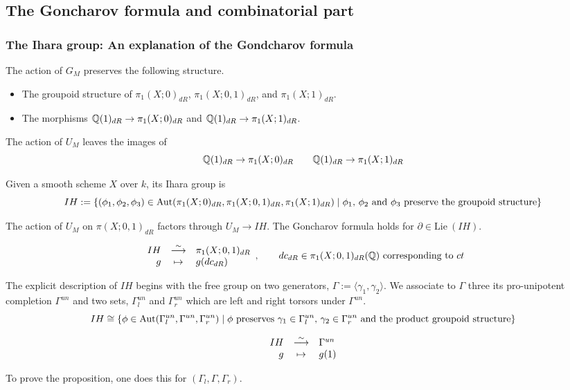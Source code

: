 \subsection{The Goncharov formula and combinatorial part}
\subsubsection{The Ihara group: An explanation of the Gondcharov formula}
\begin{rem}
The action of $G_M$ preserves the following structure.
\begin{itemize}
\item The groupoid structure of $\pi_1(X;0)_{dR}$, $\pi_1(X;0,1)_{dR}$, and $\pi_1(X;1)_{dR}$.
\item The morphisms $\mathbb{Q}(1)_{dR} \to \pi_1(X;0)_{dR}$ and $\mathbb{Q}(1)_{dR} \to \pi_1(X;1)_{dR}$.
\end{itemize}
The action of $U_M$ leaves the images of
\[\label{eq:invariantim}
\mathbb{Q}(1)_{dR} \to \pi_1(X;0)_{dR} \qquad \mathbb{Q}(1)_{dR} \to \pi_1(X;1)_{dR}
\]
\end{rem}

\begin{defn}
Given a smooth scheme $X$ over $k$, its Ihara group is
\[
IH := \{ (\phi_1, \phi_2, \phi_3) \in \mathrm{Aut}(\pi_1(X;0)_{dR}, \pi_1(X;0,1)_{dR}, \pi_1(X;1)_{dR}) \mid \textrm{$\phi_1$, $\phi_2$ and $\phi_3$ preserve the groupoid structure} \}
\]
\end{defn}
The action of $U_M$ on $\pi(X;0,1)_{dR}$ factors through $U_M \to IH$. The Goncharov formula holds for $\partial \in \mathrm{Lie~}(IH)$.

\begin{prop}
\[
\begin{array}{rcl}
IH & \stackrel{\sim}{\longrightarrow} & \pi_1(X;0,1)_{dR} \\
g & \mapsto & g(dc_{dR})
\end{array}, \qquad
dc_{dR} \in \pi_1(X;0,1)_{dR}(\mathbb{Q}) \textrm{~corresponding to $ct$}
\]
\end{prop}
The explicit description of $IH$ begins with the free group on two generators, $\Gamma := \langle \gamma_1, \gamma_2 \rangle$. We associate to $\Gamma$ three its pro-unipotent completion $\Gamma^{un}$ and two sets, $\Gamma^{un}_l$ and $\Gamma^{un}_r$ which are left and right torsors under $\Gamma^{un}$.
\[
IH \cong \{ \phi \in \mathrm{Aut}(\Gamma^{un}_l, \Gamma^{un}, \Gamma^{un}_r) \mid \textrm{$\phi$ preserves $\gamma_1 \in \Gamma^{un}_l$, $\gamma_2 \in \Gamma^{un}_r$ and the product groupoid structure} \}
\]
\begin{prop}
\[
\begin{array}{rcl}
IH & \stackrel{\sim}{\longrightarrow} & \Gamma^{un} \\
g & \mapsto & g(1)
\end{array}
\]
\end{prop}
To prove the proposition, one does this for $(\Gamma_l, \Gamma, \Gamma_r)$.

